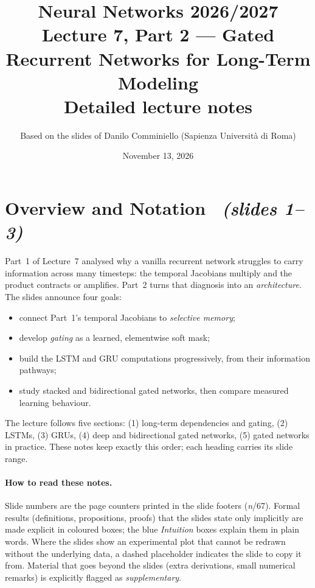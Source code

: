 \documentclass[11pt,a4paper]{article}
\title{\textbf{Neural Networks 2026/2027}\\[2mm]
\Large Lecture 7, Part 2 --- Gated Recurrent Networks for Long-Term Modeling\\[2mm]
\large Detailed lecture notes}
\author{Based on the slides of Danilo Comminiello (Sapienza Universit\`a di Roma)}
\date{November 13, 2026}
\newcommand{\sltag}[1]{\texorpdfstring{\ \emph{(slides #1)}}{ (slides #1)}}
\begin{document}
\maketitle
\tableofcontents
\newpage
\section*{Overview and Notation \sltag{1--3}}

Part~1 of Lecture~7 analysed why a vanilla recurrent network struggles to carry information across many timesteps: the temporal Jacobians multiply and the product contracts or amplifies. Part~2 turns that diagnosis into an \emph{architecture}. The slides announce four goals:
\begin{itemize}
 \item connect Part~1's temporal Jacobians to \emph{selective memory};
 \item develop \emph{gating} as a learned, elementwise soft mask;
 \item build the LSTM and GRU computations progressively, from their information pathways;
 \item study stacked and bidirectional gated networks, then compare measured learning behaviour.
\end{itemize}
The lecture follows five sections: (1) long-term dependencies and gating, (2) LSTMs, (3) GRUs, (4) deep and bidirectional gated networks, (5) gated networks in practice. These notes keep exactly this order; each heading carries its slide range.

\paragraph{How to read these notes.}
Slide numbers are the page counters printed in the slide footers (\emph{n}/67). Formal results (definitions, propositions, proofs) that the slides state only implicitly are made explicit in coloured boxes; the blue \emph{Intuition} boxes explain them in plain words. Where the slides show an experimental plot that cannot be redrawn without the underlying data, a dashed placeholder indicates the slide to copy it from. Material that goes beyond the slides (extra derivations, small numerical remarks) is explicitly flagged as \emph{supplementary}.
\end{document}
